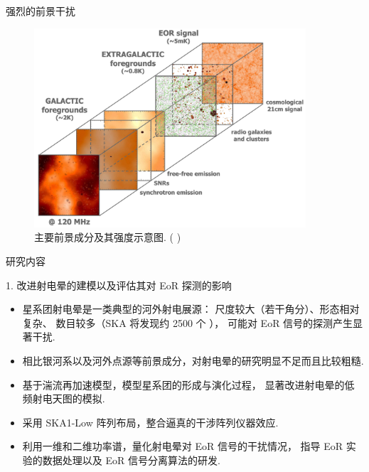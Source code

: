 \documentclass{beamer}
\newcommand{\citeay}[1]{\citeauthor{#1} \citeyear{#1} \parencite{#1}}
\begin{document}
\begin{frame}{强烈的前景干扰}
  \begin{figure}
    \centering
    \includegraphics[width=0.9\textwidth]{eor-foregrounds}
    \caption{主要前景成分及其强度示意图. (\citeay{zaroubi2013})}
  \end{figure}
\end{frame}

\begin{frame}{研究内容}
  \begin{alertblock}{1. 改进射电晕的建模以及评估其对 EoR 探测的影响}
    \begin{itemize}
      \item 星系团射电晕是一类典型的河外射电展源：
        尺度较大（若干角分）、形态相对复杂、
        数目较多（SKA 将发现约 2500 个 \cite{cassano2015}），
        可能对 EoR 信号的探测产生显著干扰.
      \item 相比银河系以及河外点源等前景成分，对射电晕的研究明显不足而且比较粗糙.
      \item 基于\alert{湍流再加速模型}，模型星系团的形成与演化过程，
        显著改进射电晕的低频射电天图的模拟.
      \item 采用 \alert{SKA1-Low 阵列布局}，整合逼真的干涉阵列仪器效应.
      \item 利用一维和二维功率谱，量化射电晕对 EoR 信号的干扰情况，
        指导 EoR 实验的数据处理以及 EoR 信号分离算法的研发.
    \end{itemize}
  \end{alertblock}
\end{frame}
\end{document}
